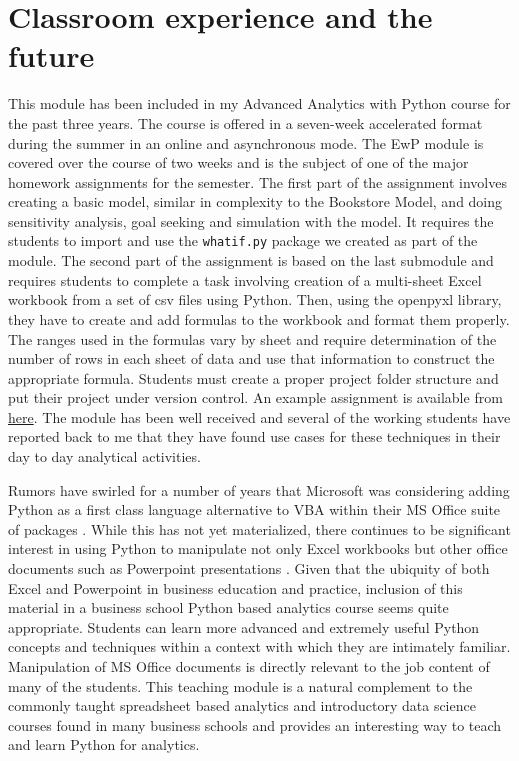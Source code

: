 \documentclass[ited,blindrev]{informs3}              %
\newcommand{\code}[1]{\texttt{#1}}
\begin{document}
\section{Classroom experience and the future}
\label{sec:classroom}

This module has been included in my Advanced Analytics with Python course for the past three years. The course is offered in a seven-week accelerated format during the summer in an online and asynchronous mode. The EwP module is covered over the course of two weeks and is the subject of one of the major homework assignments for the semester. The first part of the assignment involves creating a basic model, similar in complexity to the Bookstore Model, and doing sensitivity analysis, goal seeking and simulation with the model. It requires the students to import and use the \code{whatif.py} package we created as part of the module. The second part of the assignment is based on the last submodule and requires  students to complete a task involving creation of a multi-sheet Excel workbook from a set of csv files using Python. Then, using the openpyxl library, they have to create and add formulas to the workbook and format them properly. The ranges used in the formulas vary by sheet and require determination of the number of rows in each sheet of data and use that information to construct the appropriate formula. Students must create a proper project folder structure and put their project under version control. An example assignment is available from \href{https://drive.google.com/file/d/1prf8acZXZ4RoYBgQ8e9-eijA65uV7T-V/view?usp=sharing}{here}. The module has been well received and several of the working students have reported back to me that they have found use cases for these techniques in their day to day analytical activities.

Rumors have swirled for a number of years that Microsoft was considering adding Python as a first class language alternative to VBA within their MS Office suite of packages \cite{cimpanuMicrosoftConsidersAdding2017}. While this has not yet materialized, there continues to be significant interest in using Python to manipulate not only Excel workbooks but other office documents such as Powerpoint presentations \cite{cannyPythonpptx2013}. Given that the ubiquity of both Excel and Powerpoint in business education and practice, inclusion of this material in a business school Python based analytics course seems quite appropriate. Students can learn more advanced and extremely useful Python concepts and techniques within a context with which they are intimately familiar. Manipulation of MS Office documents is directly relevant to the job content of many of the students. This teaching module is a natural complement to the commonly taught spreadsheet based analytics and introductory data science courses found in many business schools and provides an interesting way to teach and learn Python for analytics.
\end{document}
